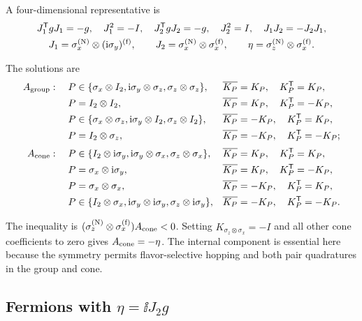 A four-dimensional representative is
\begin{equation}
\begin{gathered}
J_1^{\mathsf{T}} gJ_1=-g,\quad J_1^2=-I,\quad
J_2^{\mathsf{T}} gJ_2=-g,\quad J_2^2=I,\quad
J_1J_2=-J_2J_1,\\
J_1=\sigma_x^{({\rm N})}\otimes(\mathrm{i}\sigma_y)^{({\rm f})},\qquad
J_2=\sigma_x^{({\rm N})}\otimes\sigma_x^{({\rm f})},\qquad
\eta=\sigma_z^{({\rm N})}\otimes\sigma_x^{({\rm f})}.
\end{gathered}
\end{equation}
\begin{samepage}
The solutions are
\begin{align*}
A_{\rm group}:\quad
P&\in\{\sigma_x\otimes I_2,\mathrm{i}\sigma_y\otimes\sigma_z,
\sigma_z\otimes\sigma_z\},&&\overline{K_P}=K_P,\quad K_P^{\mathsf{T}}=K_P,\\
P&=I_2\otimes I_2,&&\overline{K_P}=K_P,\quad K_P^{\mathsf{T}}=-K_P,\\
P&\in\{\sigma_x\otimes\sigma_z,\mathrm{i}\sigma_y\otimes I_2,
\sigma_z\otimes I_2\},&&\overline{K_P}=-K_P,\quad K_P^{\mathsf{T}}=K_P,\\
P&=I_2\otimes\sigma_z,&&\overline{K_P}=-K_P,\quad K_P^{\mathsf{T}}=-K_P;\\[2pt]
A_{\rm cone}:\quad
P&\in\{I_2\otimes\mathrm{i}\sigma_y,\mathrm{i}\sigma_y\otimes\sigma_x,
\sigma_z\otimes\sigma_x\},&&\overline{K_P}=K_P,\quad K_P^{\mathsf{T}}=K_P,\\
P&=\sigma_x\otimes\mathrm{i}\sigma_y,&&\overline{K_P}=K_P,\quad K_P^{\mathsf{T}}=-K_P,\\
P&=\sigma_x\otimes\sigma_x,&&\overline{K_P}=-K_P,\quad K_P^{\mathsf{T}}=K_P,\\
P&\in\{I_2\otimes\sigma_x,\mathrm{i}\sigma_y\otimes\mathrm{i}\sigma_y,
\sigma_z\otimes\mathrm{i}\sigma_y\},&&\overline{K_P}=-K_P,\quad K_P^{\mathsf{T}}=-K_P.
\end{align*}
\end{samepage}
The inequality is \((\sigma_z^{({\rm N})}\otimes\sigma_x^{({\rm f})})A_{\rm cone}<0\).  Setting
\(K_{\sigma_z\otimes\sigma_x}=-I\) and all other cone coefficients to zero gives \(A_{\rm cone}=-\eta\).  The internal component is essential here because the symmetry permits flavor-selective hopping and both pair quadratures in the group and cone.

\subsection{Fermions with \texorpdfstring{\(\eta=\ii J_2g\)}{eta = i J2 g}}

